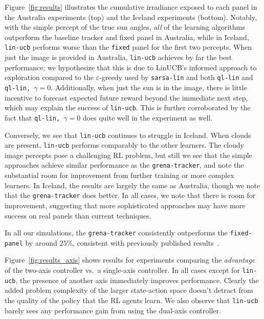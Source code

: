 \documentclass{article}
\begin{document}
{Figure~\ref{fig:results} illustrates the cumulative irradiance exposed to each panel in the Australia experiments (top) and the Iceland experiments (bottom). Notably, with the simple percept of the true sun angles, {\it all} of the learning algorithms outperform the baseline tracker and fixed panel in Australia, while in Iceland, \texttt{lin-ucb} performs worse than the \texttt{fixed} panel for the first two percepts. When just the image is provided in Australia, \texttt{lin-ucb} achieves by far the best performance; we hypothesize that this is due to LinUCB's informed approach to exploration compared to the $\varepsilon$-greedy used by \texttt{sarsa-lin} and both \texttt{ql-lin} and \texttt{ql-lin, $\gamma=0$}. Additionally, when just the sun is in the image, there is little incentive to forecast expected future reward beyond the immediate next step, which may explain the success of \texttt{lin-ucb}. This is further corroborated by the fact that \texttt{ql-lin, $\gamma=0$} does quite well in the experiment as well.

 Conversely, we see that \texttt{lin-ucb} continues to struggle in Iceland. When clouds are present, \texttt{lin-ucb} performs comparably to the other learners. The cloudy image percepts pose a challenging RL problem, but still we see that the simple approaches achieve similar performance as the \texttt{grena-tracker}, and note the substantial room for improvement from further training or more complex learners. In Iceland, the results are largely the same as Australia, though we note that the \texttt{grena-tracker} does better. In all cases, we note that there is room for improvement, suggesting that more sophisticated approaches may have more success on real panels than current techniques.

In all our simulations, the \texttt{grena-tracker} consistently outperforms the \texttt{fixed-panel} by around $25\%$, consistent with previously published results~\cite{Eke2012,mousazadeh2009review,clifford2004design}. %

Figure~\ref{fig:results_axis} shows results for experiments comparing the {\it advantage} of the two-axis controller vs.\ a single-axis controller. In all cases except for \texttt{lin-ucb}, the presence of another axis immediately improves performance. Clearly the added problem complexity of the larger state-action space doesn't detract from the quality of the policy that the RL agents learn. We also observe that \texttt{lin-ucb} barely sees any performance gain from using the dual-axis controller.





}
\end{document}
